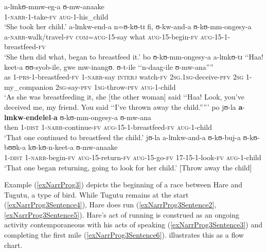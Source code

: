 \begin{exe}
\ex\label{exNarrProg2}
\begin{xlist}
\ex\label{exNarrProg2Sentence1}\gll a-lɪnkʊ-mmw-eg-a ʊ-mw-anaake\\
1-\textsc{narr}-1-take-\textsc{fv} \textsc{aug}-1-his\_child\\
\glt \lq She took her child.'
\ex\label{exNarrProg2Sentence2}\gll a-lɪnkw-end-a n=ʊ-kʊ-tɪ fi, ʊ-kw-and-a ʊ-kʊ-mm-ongesy-a\\
a-\textsc{narr}-walk/travel-\textsc{fv} \textsc{com}=\textsc{aug}-15-say what \textsc{aug}-15-begin-\textsc{fv} \textsc{aug}-15-1-breastfeed-\textsc{fv}\\
\glt \lq She then did what, began to breastfeed it.'
\ex\label{exNarrProg2Sentence3}\gll bo ʊ-kʊ-mm-ongesy-a a-lɪnkʊ-tɪ \lq\lq Haa! keet-a ʊʊ-syob-ile, gwe mw-inangʊ. ʊ-t-ile \lq\lq n-daag-ile ʊ-mw-ana''{}''\\
as 1-\textsc{prs}-1-breastfeed-\textsc{fv} 1-\textsc{narr}-say \phantom{\lq\lq}\textsc{interj} watch-\textsc{fv} \textsc{2sg.1sg}-deceive-\textsc{pfv} \textsc{2sg} 1-my\_companion \textsc{2sg}-say-\textsc{pfv} \phantom{\lq\lq}\textsc{1sg}-throw-\textsc{pfv} \textsc{aug}-1-child\\
\glt \lq As she was breastfeeding it, she [the other woman] said \lq\lq Haa! Look, you've deceived me, my friend. You said \lq\lq I've thrown away the child.''{}''{}'
\ex \label{exNarrProg2Sentence4}\gll po jʊ-la \textbf{a}-\textbf{lɪnkw}-\textbf{endelel}-\textbf{a} ʊ-kʊ-mm-ongesy-a ʊ-mw-ana\\
then 1-\textsc{dist} 1-\textsc{narr}-continue-\textsc{fv} \textsc{aug}-15-1-breastfeed-\textsc{fv} \textsc{aug}-1-child\\
\lq That one continued to breastfeed the child.'
\ex \label{exNarrProg2Sentence5}
\gll jʊ-la a-lɪnkw-and-a ʊ-kʊ-buj-a ʊ-kʊ-bʊʊk-a kʊ-kʊ-n-keet-a ʊ-mw-anaake\\
1-\textsc{dist} 1-\textsc{narr}-begin-\textsc{fv} \textsc{aug}-15-return-\textsc{fv} \textsc{aug}-15-go-\textsc{fv} 17-15-1-look-\textsc{fv} \textsc{aug}-1-child\\
\glt \lq That one began returning, going to look for her child.' [Throw away the child]
\end{xlist}
\end{exe}

\largerpage
Example (\ref{exNarrProg3}) depicts the beginning of a race between Hare and Tugutu, a type of bird. While Tugutu remains at the start (\ref{exNarrProg3Sentence4}), Hare does run (\ref{exNarrProg3Sentence2}, \ref{exNarrProg3Sentence5}). Hare's act of running is construed as an ongoing activity contemporaneous with his acts of speaking (\ref{exNarrProg3Sentence3}) and completing the first mile (\ref{exNarrProg3Sentence6}).  illustrates this as a flow chart.

